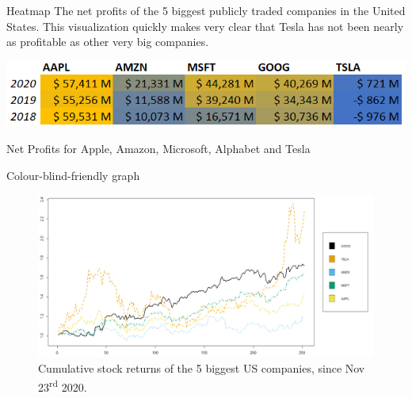 \documentclass{beamer}
\begin{document}
\begin{frame}{Heatmap}
The net profits of the 5 biggest publicly traded companies in the United States. This visualization quickly makes very clear that Tesla has not been nearly as profitable as other very big companies.
\bigbreak
\begin{table}
\includegraphics[scale=0.7]{heatmap.png}
\caption{Net Profits for Apple, Amazon, Microsoft, Alphabet and Tesla }
\end{table}
\end{frame}

 \begin{frame}{Colour-blind-friendly graph}
 \begin{figure}[h!]
  \caption{Cumulative stock returns of the 5 biggest US companies, since Nov 23\textsuperscript{rd} 2020.}
   \includegraphics[scale=0.22]{cumreturns.png}
\end{figure}

\end{frame}

\begin{frame}
\printbibliography
\end{frame}
\end{document}
